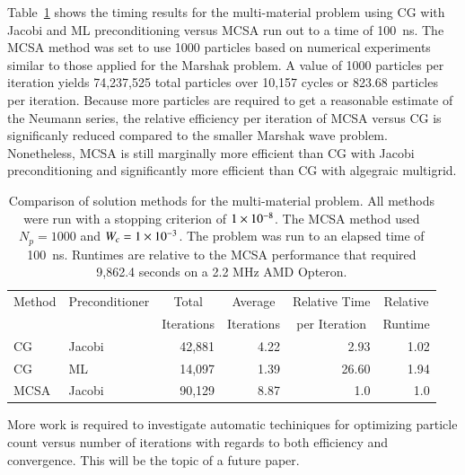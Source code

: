 \documentclass[preprint,12pt]{elsarticle}
\begin{document}
Table~\ref{tab:multimat_comparison} shows the timing results for the
multi-material problem using CG with Jacobi and ML preconditioning versus MCSA
run out to a time of 100~ns.  The MCSA method was set to use 1000 particles
based on numerical experiments similar to those applied for the Marshak
problem.  A value of 1000 particles per iteration yields 74,237,525 total
particles over 10,157 cycles or 823.68 particles per iteration.  Because more
particles are required to get a reasonable estimate of the Neumann series, the
relative efficiency per iteration of MCSA versus CG is significanly reduced
compared to the smaller Marshak wave problem.  Nonetheless, MCSA is still
marginally more efficient than CG with Jacobi preconditioning and
significantly more efficient than CG with algegraic multigrid.
\begin{table}[htbp!]
  \caption{ Comparison of solution methods for the multi-material
    problem. All methods were run with a stopping criterion of
    $1\times 10^{-8}$.  The MCSA method used $N_p=1000$ and $W_c =
    1\times 10^{-3}$.  The problem was run to an elapsed time of 100~ns.
    Runtimes are relative to the MCSA performance that required 9,862.4
    seconds on a 2.2 MHz AMD Opteron.}
  \label{tab:multimat_comparison}
  \begin{center}
    \small
    \begin{tabular}{llrrrr}\hline\hline
      \multicolumn{1}{c}{Method} &
      \multicolumn{1}{c}{Preconditioner} &
      \multicolumn{1}{c}{Total} &
      \multicolumn{1}{c}{Average} &
      \multicolumn{1}{c}{Relative Time} &
      \multicolumn{1}{c}{Relative}\\
      & & \multicolumn{1}{c}{Iterations} &
      \multicolumn{1}{c}{Iterations} &
      \multicolumn{1}{c}{per Iteration} &
      \multicolumn{1}{c}{Runtime} \\\hline\hline
      CG & Jacobi & 42,881 & 4.22 & 2.93 & 1.02 \\
      CG & ML & 14,097 & 1.39 & 26.60 & 1.94 \\
      MCSA & Jacobi & 90,129 & 8.87 & 1.0 & 1.0
      \\ \hline\hline
    \end{tabular}
  \end{center}
\end{table}
More work is required to investigate automatic techiniques for optimizing
particle count versus number of iterations with regards to both efficiency and
convergence.  This will be the topic of a future paper.
\end{document}
